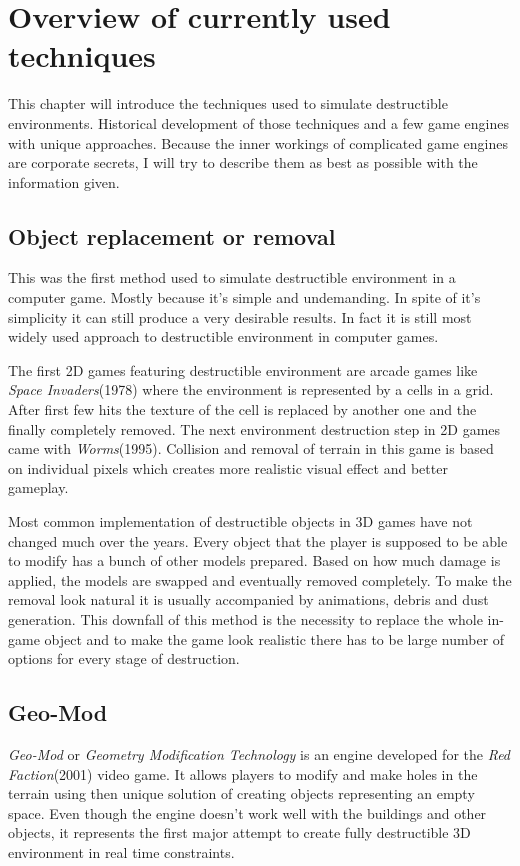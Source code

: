 \chapter{Overview of currently used techniques}
This chapter will introduce the techniques used to simulate destructible environments. Historical development of those techniques and a few game engines with unique approaches. Because the inner workings of complicated game engines are corporate secrets, I will try to describe them as best as possible with the information given.

\section{Object replacement or removal}
\par This was the first method used to simulate destructible environment in a computer game. Mostly because it's simple and undemanding. In spite of it's simplicity it can still produce a very desirable results. In fact it is still most widely used approach to destructible environment in computer games.  \par 

The first 2D games featuring destructible environment are arcade games like \emph{Space Invaders}\cite{invaders}(1978) where the environment is represented by a cells in a grid. After first few hits the texture of the cell is replaced by another one and the finally completely removed. The next environment destruction step in 2D games came with \emph{Worms}\cite{worms}(1995). Collision and removal of terrain in this game is based on individual pixels which creates more realistic visual effect and better gameplay. \par 

Most common implementation of destructible objects in 3D games have not changed much over the years. Every object that the player is supposed to be able to modify has a bunch of other models prepared. Based on how much damage is applied, the models are swapped and eventually removed completely. To make the removal look natural it is usually accompanied by animations, debris and dust generation. This downfall of this method is the necessity to replace the whole in-game object and to make the game look realistic there has to be large number of options for every stage of destruction.

\section{Geo-Mod}
\emph{Geo-Mod}\cite{geomod} or \emph{Geometry Modification Technology} is an engine developed for the \emph{Red Faction}\cite{redfaction}(2001) video game. It allows players to modify and make holes in the terrain using then unique solution of creating objects representing an empty space. Even though the engine doesn't work well with the buildings and other objects, it represents the first major attempt to create fully destructible 3D environment in real time constraints.

